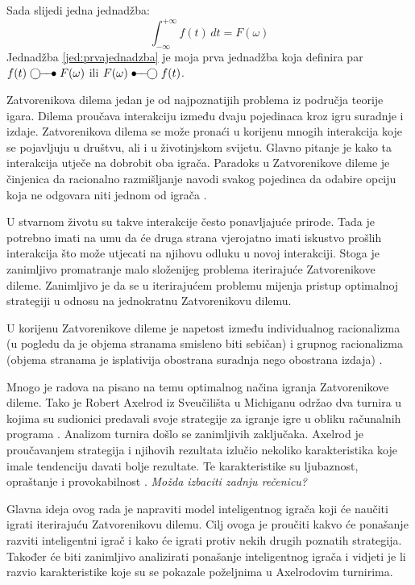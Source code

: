 \documentclass[zavrsnirad]{fer}
\begin{document}
Sada slijedi jedna jednadžba:
\begin{equation}
  \label{jed:prvajednadzba}
  \int_{-\infty}^{+\infty}f(t)\,dt=F(\omega)
\end{equation}
Jednadžba \eqref{jed:prvajednadzba} je moja prva jednadžba koja definira par $f(t)\ufrek F(\omega)$ ili $F(\omega)\uvrem f(t)$.

\cite{1980Axelrod1}
\cite{1980Axelrod2}
\cite{igraHrEnc}

\break

	Zatvorenikova dilema jedan je od najpoznatijih problema iz područja teorije igara. Dilema proučava interakciju između dvaju pojedinaca kroz igru suradnje i izdaje. Zatvorenikova dilema se može pronaći u korijenu mnogih interakcija koje se pojavljuju u društvu, ali i u životinjskom svijetu. Glavno pitanje je kako ta interakcija utječe na dobrobit oba igrača. Paradoks u Zatvorenikove dileme je činjenica da racionalno razmišljanje navodi svakog pojedinca da odabire opciju koja ne odgovara niti jednom od igrača \cite{PrisDilemmaHrEnc}.
	
	U stvarnom životu su takve interakcije često ponavljajuće prirode. Tada je potrebno imati na umu da će druga strana vjerojatno imati iskustvo prošlih interakcija što može utjecati na njihovu odluku u novoj interakciji. Stoga je zanimljivo promatranje malo složenijeg problema iterirajuće Zatvorenikove dileme. Zanimljivo je da se u iterirajućem problemu mijenja pristup optimalnoj strategiji u odnosu na jednokratnu Zatvorenikovu dilemu.
	
	U korijenu Zatvorenikove dileme je napetost između individualnog racionalizma (u pogledu da je objema stranama smisleno biti sebičan) i grupnog racionalizma (objema stranama je isplativija obostrana suradnja nego obostrana izdaja) \cite{1980Axelrod1}.
	
	Mnogo je radova na pisano na temu optimalnog načina igranja Zatvorenikove dileme. Tako je Robert Axelrod iz Sveučilišta u Michiganu održao dva turnira u kojima su sudionici predavali svoje strategije za igranje igre u obliku računalnih programa \cite{1980Axelrod1} \cite{1980Axelrod2}. Analizom turnira došlo se zanimljivih zaključaka. Axelrod je proučavanjem strategija i njihovih rezultata izlučio nekoliko karakteristika koje imale tendenciju davati bolje rezultate. Te karakteristike su ljubaznost, opraštanje i provokabilnost \cite{1980Axelrod2}. \textit{Možda izbaciti zadnju rečenicu?}
	
	Glavna ideja ovog rada je napraviti model inteligentnog igrača koji će naučiti igrati iterirajuću Zatvorenikovu dilemu. Cilj ovoga je proučiti kakvo će ponašanje razviti inteligentni igrač i kako će igrati protiv nekih drugih poznatih strategija. Također će biti zanimljivo analizirati ponašanje inteligentnog igrača i vidjeti je li razvio karakteristike koje su se pokazale poželjnima u Axelrodovim turnirima.
\end{document}
